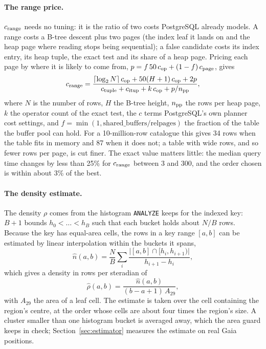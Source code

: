 \documentclass[preprint,12pt]{elsarticle}
\newcommand{\Sect}{Section}
\begin{document}
\paragraph{The range price.}
\label{sec:calib}
$c_{\rm range}$ needs no tuning: it is the ratio of two costs PostgreSQL already
models. A range costs a B-tree descent plus two pages (the index leaf it lands on and
the heap page where reading stops being sequential); a false candidate costs its index
entry, its heap tuple, the exact test and its share of a heap page. Pricing each page by where it is likely to come from,
$p = f\,50\,c_{\rm op} + (1-f)\,c_{\rm page}$, gives
\begin{equation}
  c_{\rm range} = \frac{\lceil\log_2 N\rceil\,c_{\rm op} + 50(H+1)\,c_{\rm op} + 2p}
    {c_{\rm tuple} + c_{\rm itup} + k\,c_{\rm op} + p/n_{\rm pp}},
  \label{eq:crange}
\end{equation}
where $N$ is the number of rows, $H$ the B-tree height, $n_{\rm pp}$ the rows per heap
page, $k$ the operator count of the exact test, the $c$ terms PostgreSQL's own planner
cost settings, and $f=\min(1,\mathrm{shared\_buffers}/\mathrm{relpages})$ the fraction
of the table the buffer pool can hold. For a 10-million-row catalogue this gives 34 rows
when the table fits in memory and 87 when it does not; a table with wide rows, and so
fewer rows per page, is cut finer. The exact value matters little: the median query time changes by less
than 25\% for $c_{\rm range}$ between 3 and 300, and the order chosen is within about 3\%
of the best.

\paragraph{The density estimate.}
\label{sec:density}
The density $\rho$ comes from the histogram \texttt{ANALYZE} keeps for the indexed key:
$B+1$ bounds $h_0<\dots<h_B$ such that each bucket holds about $N/B$ rows. Because the
key has equal-area cells, the rows in a key range $[a,b]$ can be estimated by linear
interpolation within the buckets it spans,
\begin{equation}
  \hat{n}(a,b) = \frac{N}{B}\sum_{i} \frac{\bigl|[a,b] \cap [h_i, h_{i+1})\bigr|}{h_{i+1}-h_i},
  \label{eq:hist}
\end{equation}
which gives a density in rows per steradian of
\begin{equation}
  \hat{\rho}(a,b) = \frac{\hat{n}(a,b)}{(b-a+1)\,A_{29}},
  \label{eq:rho}
\end{equation}
with $A_{29}$ the area of a leaf cell. The estimate is taken over the cell containing the
region's centre, at the order whose cells are about four times the region's size. A
cluster smaller than one histogram bucket is averaged away, which the area guard keeps
in check; \Sect~\ref{sec:estimator} measures the estimate on real Gaia positions.
\end{document}
